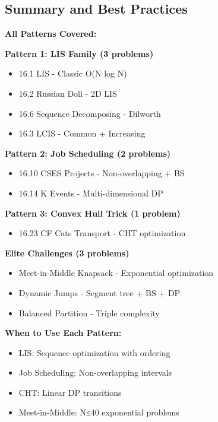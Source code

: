 \documentclass[11pt,a4paper,oneside]{book}
\begin{document}
\subsection{Summary and Best Practices}

\begin{tcolorbox}[
    enhanced,breakable,
    colback=primaryblue!10,
    colframe=primaryblue,
    boxrule=2pt,
    arc=4mm,
    title=\textbf{Binary Search with DP: Complete Mastery}
]
\textbf{All Patterns Covered:}

\textbf{Pattern 1: LIS Family (3 problems)}
\begin{itemize}
\item 16.1 LIS - Classic O(N log N)
\item 16.2 Russian Doll - 2D LIS
\item 16.6 Sequence Decomposing - Dilworth
\item 16.3 LCIS - Common + Increasing
\end{itemize}

\textbf{Pattern 2: Job Scheduling (2 problems)}
\begin{itemize}
\item 16.10 CSES Projects - Non-overlapping + BS
\item 16.14 K Events - Multi-dimensional DP
\end{itemize}

\textbf{Pattern 3: Convex Hull Trick (1 problem)}
\begin{itemize}
\item 16.23 CF Cats Transport - CHT optimization
\end{itemize}

\textbf{Elite Challenges (3 problems)}
\begin{itemize}
\item Meet-in-Middle Knapsack - Exponential optimization
\item Dynamic Jumps - Segment tree + BS + DP
\item Balanced Partition - Triple complexity
\end{itemize}

\textbf{When to Use Each Pattern:}
\begin{itemize}
\item LIS: Sequence optimization with ordering
\item Job Scheduling: Non-overlapping intervals
\item CHT: Linear DP transitions
\item Meet-in-Middle: N≤40 exponential problems
\end{itemize}


\end{tcolorbox}
\end{document}
